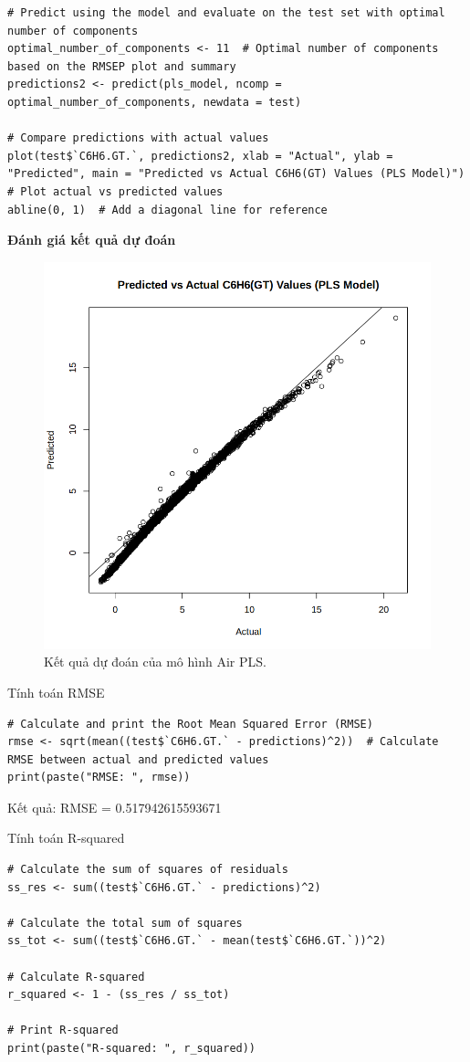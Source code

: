 \begin{lstlisting}
# Predict using the model and evaluate on the test set with optimal number of components
optimal_number_of_components <- 11  # Optimal number of components based on the RMSEP plot and summary
predictions2 <- predict(pls_model, ncomp = optimal_number_of_components, newdata = test)  

# Compare predictions with actual values
plot(test$`C6H6.GT.`, predictions2, xlab = "Actual", ylab = "Predicted", main = "Predicted vs Actual C6H6(GT) Values (PLS Model)")  # Plot actual vs predicted values
abline(0, 1)  # Add a diagonal line for reference
\end{lstlisting}
\textbf{Đánh giá kết quả dự đoán}
\begin{figure}[H]
    \centering
    \includegraphics[width=0.75\columnwidth]{air_figures/pls_prediction.png}
    \caption{Kết quả dự đoán của mô hình Air PLS.}
    \label{fig:air_pls_prediction}
\end{figure}

Tính toán RMSE
\begin{lstlisting}
# Calculate and print the Root Mean Squared Error (RMSE)
rmse <- sqrt(mean((test$`C6H6.GT.` - predictions)^2))  # Calculate RMSE between actual and predicted values
print(paste("RMSE: ", rmse)) 
\end{lstlisting}
Kết quả: RMSE = 0.517942615593671

Tính toán R-squared
\begin{lstlisting}
# Calculate the sum of squares of residuals
ss_res <- sum((test$`C6H6.GT.` - predictions)^2)

# Calculate the total sum of squares
ss_tot <- sum((test$`C6H6.GT.` - mean(test$`C6H6.GT.`))^2)

# Calculate R-squared
r_squared <- 1 - (ss_res / ss_tot)

# Print R-squared
print(paste("R-squared: ", r_squared))
\end{lstlisting}


